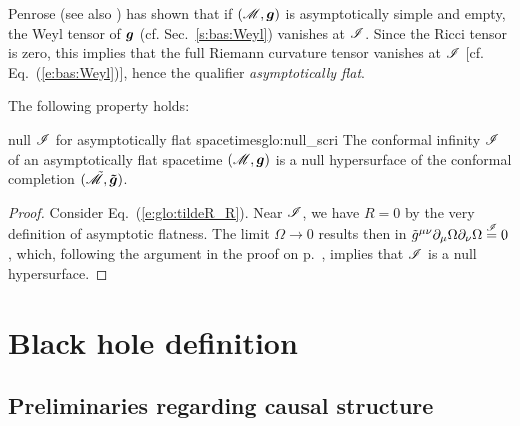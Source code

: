 Penrose \cite{Penro65b} (see also \cite{Fraue04}) has shown that if $(\mathscr{M},\bm{g})$
is asymptotically simple and empty, the Weyl tensor of $\bm{g}$ (cf. Sec.~\ref{s:bas:Weyl})
vanishes at $\mathscr{I}$. Since the
Ricci tensor is zero, this implies that the full Riemann curvature tensor vanishes
at $\mathscr{I}$ [cf. Eq.~(\ref{e:bas:Weyl})], hence the qualifier \emph{asymptotically flat}.

The following property holds:
\begin{tprop}{null $\mathscr{I}$ for asymptotically flat spacetimes}{glo:null_scri}
The conformal infinity $\mathscr{I}$ of an asymptotically flat spacetime $(\mathscr{M},\bm{g})$
is a null hypersurface of the conformal completion $(\tilde{\mathscr{M}},\bm{\tilde{g}})$.
\end{tprop}

\begin{proof}
Consider Eq.~(\ref{e:glo:tildeR_R}). Near $\mathscr{I}$, we have $R=0$ by the
very definition of asymptotic flatness. The limit $\Omega\rightarrow 0$
results then in
$\tilde{g}^{\mu\nu} \partial_\mu \Omega \partial_\nu \Omega \stackrel{\mathscr{I}}{=} 0$,
which, following the argument in the proof on p.~\pageref{e:glo:tildeR_R}, implies that
$\mathscr{I}$ is a null hypersurface.
\end{proof}



\section{Black hole definition} \label{s:glo:BH}

\subsection{Preliminaries regarding causal structure}  \label{s:glo:causal_struct}

